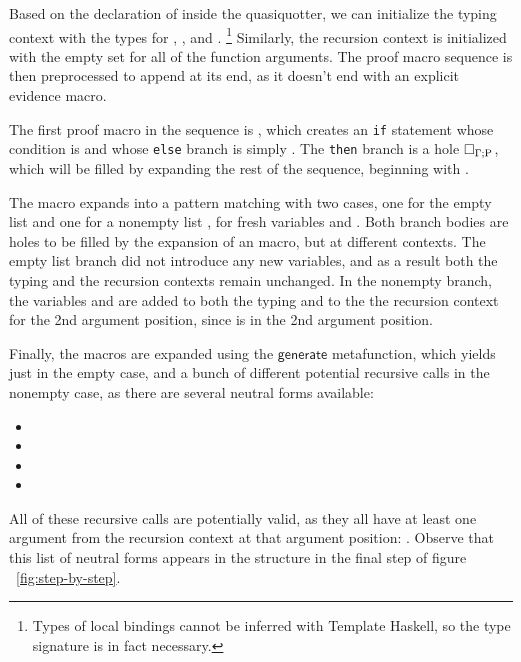 Based on the declaration of  inside the quasiquotter,
we can initialize the typing context with the types for ,
, and . 
\footnote{Types of local bindings cannot be inferred with Template
  Haskell, so the type signature is in fact necessary.}%
%
Similarly, the recursion context is initialized with the empty set for
all of the function arguments.
%
The proof macro sequence is then preprocessed to append  
at its end, as it doesn't end with an explicit evidence macro.

%
The first proof macro in the sequence is ,
which creates an \texttt{if} statement whose condition is 
and whose \texttt{else} branch is simply .
%
The \texttt{then} branch is a hole $\Box_{\Gamma ; \mathrm{P}}$, which
will be filled by expanding the rest of the sequence, beginning with
 .

The   macro expands into a pattern matching with
two cases, one for the empty list and one for a nonempty list ,
for fresh variables  and .
%
Both branch bodies are holes to be filled by the expansion of an  macro, but at different contexts.
%
The empty list branch did not introduce any new variables, and as a result
both the typing and the recursion contexts remain unchanged. In the nonempty
branch, the variables  and  are added to both the typing and to the the recursion context for the 2nd argument position, since  is in the 2nd argument position.

Finally, the  macros are expanded using the $\mathsf{generate}$ metafunction, which yields just  in the empty case, and a bunch of different potential recursive calls in the nonempty case, as there are several
neutral forms available:
\begin{itemize}
  \item {}
  \item {}
  \item {}
  \item {}
\end{itemize}
All of these recursive calls are potentially valid, as they all have
at least one argument from the recursion context at that argument
position: .
Observe that this list of neutral forms appears in the  structure in the 
final step of figure ~\ref{fig:step-by-step}.

